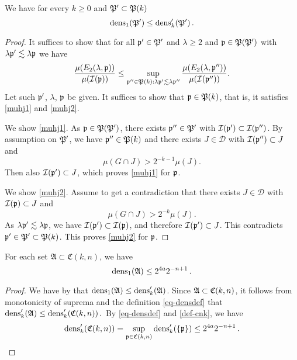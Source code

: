 \begin{lemma}
    \label{dens-compare}
    \leanok
    We have for every $k\ge 0$ and ${\mathfrak P}'\subset {\mathfrak P}(k)$
\begin{equation}
    \operatorname{\operatorname{dens}}_1({\mathfrak P}')\le \operatorname{\operatorname{dens}}_k'({\mathfrak P}')\, .
\end{equation}
\end{lemma}
\begin{proof}
\leanok
It suffices to show that for all ${\mathfrak p}'\in {\mathfrak P}'$
and $\lambda\ge 2$ and ${\mathfrak p}\in {\mathfrak P}({\mathfrak P}')$ with $\lambda {\mathfrak p}' \lesssim \lambda {\mathfrak p}$ we have
\begin{equation}
    \frac{\mu({E}_2(\lambda, {\mathfrak p}))}{\mu({\mathcal{I}}({\mathfrak p}))}
    \le \sup_{{\mathfrak p}'' \in {\mathfrak P}(k): \lambda {\mathfrak p}' \lesssim \lambda {\mathfrak p}''}
    \frac{\mu({E}_2(\lambda, {\mathfrak p}''))}{\mu({\mathcal{I}}({\mathfrak p}''))}.
\end{equation}
    Let such ${\mathfrak p}'$, $\lambda$, ${\mathfrak p}$ be given.
    It suffices to show that ${\mathfrak p}\in {\mathfrak P}(k)$,
    that is, it satisfies \eqref{muhj1}
    and \eqref{muhj2}.

We show \eqref{muhj1}.
 As ${\mathfrak p}\in {\mathfrak P}({\mathfrak P}')$, there exists
${\mathfrak p}''\in {\mathfrak P}'$ with ${\mathcal{I}}({\mathfrak p}')\subset {\mathcal{I}}({\mathfrak p}'')$. By assumption on ${\mathfrak P}'$, we have ${\mathfrak p}''\in {\mathfrak P}(k)$ and there exists
$J\in \mathcal{D}$ with
   ${\mathcal{I}}({\mathfrak p}'')\subset J$ and
   \begin{equation}
       \mu(G\cap J)>2^{-k-1} \mu(J).
   \end{equation}
Then also ${\mathcal{I}}({\mathfrak p}')\subset J$, which proves
\eqref{muhj1} for ${\mathfrak p}$.

We show \eqref{muhj2}. Assume to get a contradiction that
there exists $J\in \mathcal{D}$ with
   ${\mathcal{I}}({\mathfrak p})\subset J$ and
   \begin{equation}\label{mugj}
       \mu(G\cap J)>2^{-k} \mu(J).
   \end{equation}
   As $\lambda{\mathfrak p}'\lesssim \lambda{\mathfrak p}$, we have ${\mathcal{I}}({\mathfrak p}')\subset {\mathcal{I}}({\mathfrak p})$, and therefore
    ${\mathcal{I}}({\mathfrak p}')\subset J$. This contradicts
   ${\mathfrak p}'\in {\mathfrak P}'\subset {\mathfrak P}(k)$. This proves
\eqref{muhj2} for ${\mathfrak p}$.
\end{proof}

\begin{lemma}[C dens1]
    \label{C-dens1}
    \leanok
    For each set $\mathfrak{A} \subset \mathfrak{C}(k,n)$, we have
    $$
        \operatorname{\operatorname{dens}}_1(\mathfrak{A}) \le 2^{4a}2^{-n+1}\,.
    $$
\end{lemma}

\begin{proof}
    \leanok
    We have by  that
    $\operatorname{\operatorname{dens}}_1(\mathfrak{A}) \le \operatorname{\operatorname{dens}}_k'(\mathfrak{A})$. Since $\mathfrak{A} \subset {\mathfrak C}(k,n)$, it follows from monotonicity of suprema and the definition \eqref{eq-densdef} that
    $
        \operatorname{\operatorname{dens}}_k'(\mathfrak{A}) \le \operatorname{\operatorname{dens}}_k'({\mathfrak C}(k,n))\,.
    $
    By \eqref{eq-densdef} and \eqref{def-cnk}, we have
    $$
        \operatorname{\operatorname{dens}}_k'({\mathfrak C}(k,n)) = \sup_{{\mathfrak p} \in {\mathfrak C}(k,n)} \operatorname{\operatorname{dens}}_k'(\{{\mathfrak p}\}) \le 2^{4a}2^{-n+1}\,.
    $$
\end{proof}

